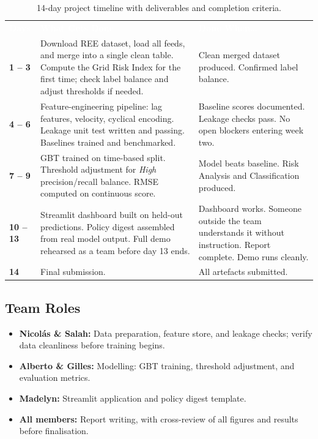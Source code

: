 \documentclass[11pt, a4paper]{article}
\begin{document}
\begin{table}[H]
\caption{14-day project timeline with deliverables and completion criteria.}
\label{tab:timeline}
\small
\setlength{\extrarowheight}{2pt}
\begin{tabularx}{\linewidth}{
  C{1.5cm}
  P{6.6cm}
  P{6.6cm}}

\textcolor{white}{\textbf{Days}} &
\textcolor{white}{\textbf{What Gets Done}} &
\textcolor{white}{\textbf{Done When\ldots}} \\

\textbf{1 -- 3} &
Download REE dataset, load all feeds, and merge into a single clean
table. Compute the Grid Risk Index for the first
time; check label balance and adjust thresholds if needed. &
Clean merged dataset produced. Confirmed label balance. \\

\textbf{4 -- 6} &
Feature-engineering pipeline: lag features, velocity, cyclical encoding.
Leakage unit test written and passing. Baselines trained and benchmarked. &
Baseline scores documented. Leakage checks pass. No open blockers
entering week two. \\

\textbf{7 -- 9} &
GBT trained on time-based split. Threshold adjustment for \textit{High} precision/recall balance. RMSE computed on continuous score. & Model beats baseline. Risk Analysis and Classification produced. \\

\textbf{10 -- 13} &
Streamlit dashboard built on held-out predictions. Policy digest
assembled from real model output. Full demo rehearsed as a team before
day 13 ends. &
Dashboard works. Someone outside the team understands it without
instruction. Report complete. Demo runs cleanly. \\

\textbf{14} &
Final submission. &
All artefacts submitted. \\

\end{tabularx}
\end{table}

\subsection{Team Roles}

\begin{itemize}
  \item \textbf{Nicolás \& Salah:} Data preparation, feature store, and
        leakage checks; verify data cleanliness before training begins.
  \item \textbf{Alberto \& Gilles:} Modelling: GBT training,
        threshold adjustment, and evaluation metrics.
  \item \textbf{Madelyn:} Streamlit application and policy digest template.
  \item \textbf{All members:} Report writing, with cross-review of all
        figures and results before finalisation.
\end{itemize}
\end{document}
